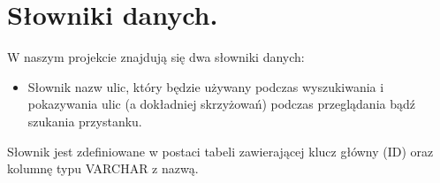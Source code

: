 \section{Słowniki danych.}
W naszym projekcie znajdują się dwa słowniki danych:
\begin{itemize}
 \item Słownik nazw ulic, który będzie używany podczas wyszukiwania i pokazywania ulic (a dokładniej skrzyżowań) podczas przeglądania bądź szukania przystanku.
\end{itemize}

Słownik jest zdefiniowane w postaci tabeli zawierającej klucz główny (ID) oraz kolumnę typu VARCHAR z nazwą.